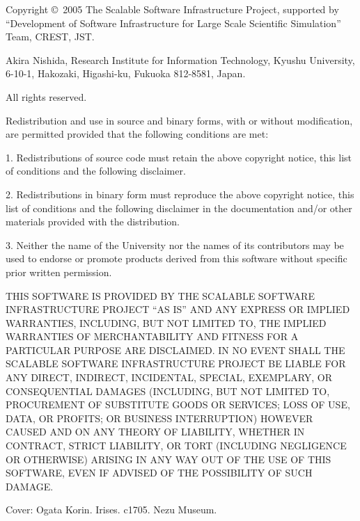 \documentclass[a4paper]{article}
\begin{document}
\newpage
\begin{flushleft}
{\small
Copyright \copyright\ 2005 The Scalable Software Infrastructure Project,
supported by ``Development of Software Infrastructure for Large Scale
Scientific Simulation'' Team, CREST, JST.

Akira Nishida, Research Institute for Information Technology, 
Kyushu University, 6-10-1, Hakozaki, Higashi-ku, Fukuoka 812-8581, Japan.

All rights reserved.

\vspace*{5mm}
 Redistribution and use in source and binary forms, with or without
 modification, are permitted provided that the following conditions are
 met:

 1. Redistributions of source code must retain the above copyright
 notice, this list of conditions and the following disclaimer.

 2. Redistributions in binary form must reproduce the above copyright
 notice, this list of conditions and the following disclaimer in the
 documentation and/or other materials provided with the distribution.

 3. Neither the name of the University nor the names of its contributors
 may be used to endorse or promote products derived from this software
 without specific prior written permission.

\vspace*{5mm}
 THIS SOFTWARE IS PROVIDED BY THE SCALABLE SOFTWARE INFRASTRUCTURE
 PROJECT ``AS IS'' AND ANY EXPRESS OR IMPLIED WARRANTIES, INCLUDING, BUT
 NOT LIMITED TO, THE IMPLIED WARRANTIES OF MERCHANTABILITY AND FITNESS
 FOR A PARTICULAR PURPOSE ARE DISCLAIMED. IN NO EVENT SHALL THE SCALABLE
 SOFTWARE INFRASTRUCTURE PROJECT BE LIABLE FOR ANY DIRECT, INDIRECT,
 INCIDENTAL, SPECIAL, EXEMPLARY, OR CONSEQUENTIAL DAMAGES (INCLUDING,
 BUT NOT LIMITED TO, PROCUREMENT OF SUBSTITUTE GOODS OR SERVICES; LOSS
 OF USE, DATA, OR PROFITS; OR BUSINESS INTERRUPTION) HOWEVER CAUSED AND
 ON ANY THEORY OF LIABILITY, WHETHER IN CONTRACT, STRICT LIABILITY, OR
 TORT (INCLUDING NEGLIGENCE OR OTHERWISE) ARISING IN ANY WAY OUT OF THE
 USE OF THIS SOFTWARE, EVEN IF ADVISED OF THE POSSIBILITY OF SUCH
 DAMAGE.

\vfill
Cover: Ogata Korin. Irises. c1705. Nezu Museum.
}
\end{flushleft}
\thispagestyle{empty}

\newpage
{}
\tableofcontents

\setcounter{section}{0}
\end{document}
